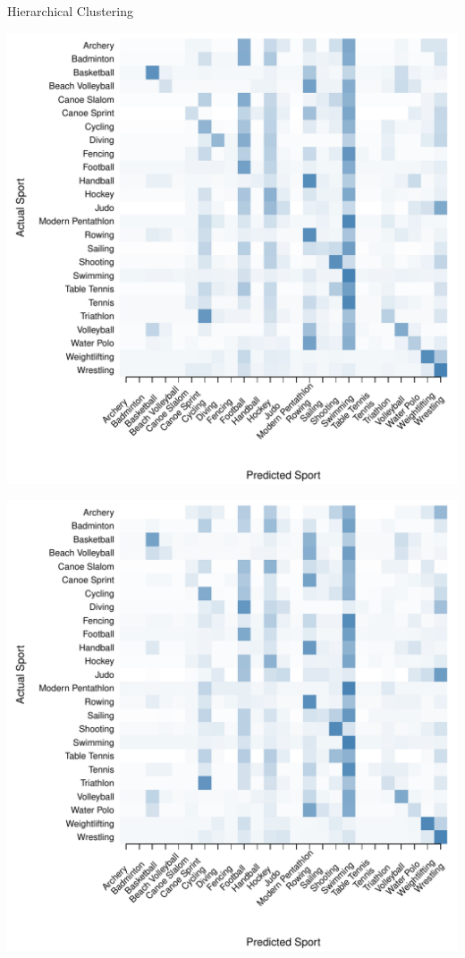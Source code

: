   \begin{center}
  Hierarchical Clustering \\
  \begin{minipage}{0.45\textwidth}
    \begin{center}
      \includegraphics[scale=0.27]{../graphics/sportMclust-trn.pdf}
    \end{center}
  \end{minipage}
  \hspace{0.05\textwidth}
  \begin{minipage}{0.45\textwidth}
    \begin{center}
      \includegraphics[scale=0.27]{../graphics/sportMclust-tst.pdf}
    \end{center}
  \end{minipage}



\end{center}
